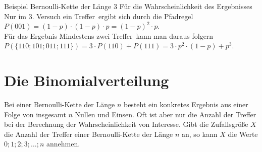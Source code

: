 \begin{bsp}{Beispiel Bernoulli-Kette der Länge 3}{}
 Für die Wahrscheinlichkeit des Ergebnisses \glqq Nur im 3. Versuch ein Treffer\grqq\ ergibt sich durch die Pfadregel\\ \(P(001) = (1-p)\cdot (1-p) \cdot p = \left(1-p\right)^2 \cdot p\). \\ Für das Ergebnis \glqq Mindestens zwei Treffer\grqq\ kann man daraus folgern\\ \(P(\{110;101;011;111\}) = 3 \cdot P(110) + P(111) = 3\cdot p^2 \cdot \left(1-p\right) + p^3\). 
\end{bsp}
\section{Die Binomialverteilung}
Bei einer Bernoulli-Kette der Länge \(n\) besteht ein konkretes Ergebnis aus einer Folge von insgesamt \(n\) Nullen und Einsen. Oft ist aber nur die Anzahl der Treffer bei der Berechnung der Wahrscheinlichkeit von Interesse.  Gibt die Zufallsgröße \(X\) die Anzahl der Treffer einer Bernoulli-Kette der Länge \(n\) an, so kann \(X\) die Werte \(0;1;2;3; \ldots ; n\) annehmen. 

